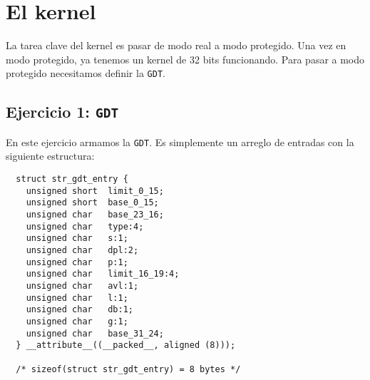 \documentclass[twocolumn,10pt]{article}
\newcommand{\GDT}{\texttt{GDT}}
\begin{document}
\section{El kernel}

La tarea clave del kernel es pasar de modo real a modo protegido. Una
vez en modo protegido, ya tenemos un kernel de 32 bits
funcionando. Para pasar a modo protegido necesitamos definir la \GDT.

\subsection{Ejercicio 1: \GDT}

En este ejercicio armamos la \GDT. Es simplemente un arreglo de
entradas con la siguiente estructura:

\begin{lstlisting}
  struct str_gdt_entry {
    unsigned short  limit_0_15;
    unsigned short  base_0_15;
    unsigned char   base_23_16;
    unsigned char   type:4;
    unsigned char   s:1;
    unsigned char   dpl:2;
    unsigned char   p:1;
    unsigned char   limit_16_19:4;
    unsigned char   avl:1;
    unsigned char   l:1;
    unsigned char   db:1;
    unsigned char   g:1;
    unsigned char   base_31_24;
  } __attribute__((__packed__, aligned (8)));

  /* sizeof(struct str_gdt_entry) = 8 bytes */
\end{lstlisting}
\end{document}
